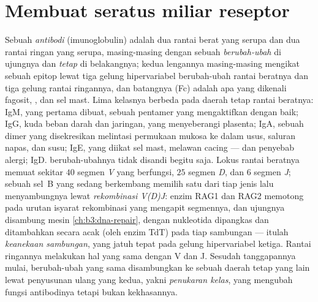 \section{Membuat seratus miliar reseptor}

\begin{definition}\label{def:b3:adaptive-immunity:antibody}
%
Sebuah \emph{antibodi} (imunoglobulin) adalah dua rantai berat yang serupa dan
dua rantai ringan yang serupa, masing-masing dengan sebuah 
\emph{berubah-ubah} di ujungnya dan  \emph{tetap} di belakangnya; kedua
lengannya masing-masing mengikat sebuah epitop lewat tiga gelung hipervariabel
 berubah-ubah rantai beratnya dan tiga gelung rantai ringannya, dan
batangnya (Fc) adalah apa yang dikenali fagosit, , dan sel mast. Lima
kelasnya berbeda pada daerah tetap rantai beratnya: IgM, yang pertama dibuat,
sebuah pentamer yang mengaktifkan  dengan baik; IgG, kuda beban darah
dan jaringan, yang menyeberangi plasenta; IgA, sebuah dimer yang disekresikan
melintasi permukaan mukosa ke dalam usus, saluran napas, dan susu; IgE, yang
diikat sel mast, melawan cacing --- dan penyebab alergi; IgD. 
berubah-ubahnya tidak disandi begitu saja. Lokus rantai beratnya memuat sekitar
$40$ segmen \emph{V} yang berfungsi, $25$ segmen \emph{D}, dan $6$ segmen
\emph{J}; sebuah sel~B yang sedang berkembang memilih satu dari tiap jenis lalu
menyambungnya lewat \emph{rekombinasi V(D)J}: enzim RAG1 dan RAG2 memotong pada
urutan isyarat rekombinasi yang mengapit segmennya, dan ujungnya disambung mesin
 \cref{ch:b3:dna-repair}, dengan nukleotida
dipangkas dan ditambahkan secara acak (oleh enzim TdT) pada tiap sambungan ---
itulah \emph{keanekaan sambungan}, yang jatuh tepat pada gelung hipervariabel
ketiga. Rantai ringannya melakukan hal yang sama dengan V dan J. Sesudah
tanggapannya mulai,  berubah-ubah yang sama disambungkan ke sebuah daerah
tetap yang lain lewat penyusunan ulang yang kedua, yakni \emph{penukaran kelas},
yang mengubah fungsi antibodinya tetapi bukan kekhasannya.
\end{definition}

